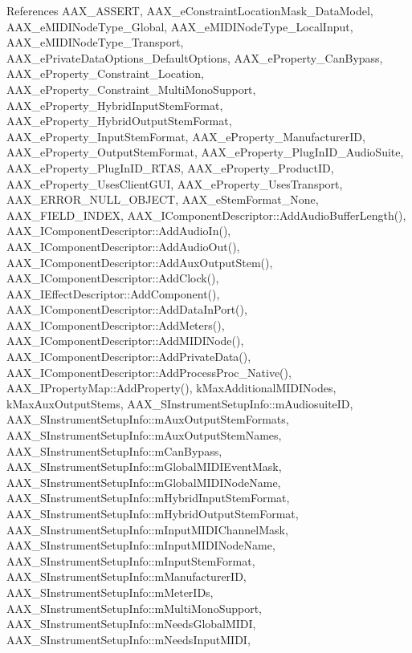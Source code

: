 References A\+A\+X\+\_\+\+A\+S\+S\+E\+R\+T, A\+A\+X\+\_\+e\+Constraint\+Location\+Mask\+\_\+\+Data\+Model, A\+A\+X\+\_\+e\+M\+I\+D\+I\+Node\+Type\+\_\+\+Global, A\+A\+X\+\_\+e\+M\+I\+D\+I\+Node\+Type\+\_\+\+Local\+Input, A\+A\+X\+\_\+e\+M\+I\+D\+I\+Node\+Type\+\_\+\+Transport, A\+A\+X\+\_\+e\+Private\+Data\+Options\+\_\+\+Default\+Options, A\+A\+X\+\_\+e\+Property\+\_\+\+Can\+Bypass, A\+A\+X\+\_\+e\+Property\+\_\+\+Constraint\+\_\+\+Location, A\+A\+X\+\_\+e\+Property\+\_\+\+Constraint\+\_\+\+Multi\+Mono\+Support, A\+A\+X\+\_\+e\+Property\+\_\+\+Hybrid\+Input\+Stem\+Format, A\+A\+X\+\_\+e\+Property\+\_\+\+Hybrid\+Output\+Stem\+Format, A\+A\+X\+\_\+e\+Property\+\_\+\+Input\+Stem\+Format, A\+A\+X\+\_\+e\+Property\+\_\+\+Manufacturer\+I\+D, A\+A\+X\+\_\+e\+Property\+\_\+\+Output\+Stem\+Format, A\+A\+X\+\_\+e\+Property\+\_\+\+Plug\+In\+I\+D\+\_\+\+Audio\+Suite, A\+A\+X\+\_\+e\+Property\+\_\+\+Plug\+In\+I\+D\+\_\+\+R\+T\+A\+S, A\+A\+X\+\_\+e\+Property\+\_\+\+Product\+I\+D, A\+A\+X\+\_\+e\+Property\+\_\+\+Uses\+Client\+G\+U\+I, A\+A\+X\+\_\+e\+Property\+\_\+\+Uses\+Transport, A\+A\+X\+\_\+\+E\+R\+R\+O\+R\+\_\+\+N\+U\+L\+L\+\_\+\+O\+B\+J\+E\+C\+T, A\+A\+X\+\_\+e\+Stem\+Format\+\_\+\+None, A\+A\+X\+\_\+\+F\+I\+E\+L\+D\+\_\+\+I\+N\+D\+E\+X, A\+A\+X\+\_\+\+I\+Component\+Descriptor\+::\+Add\+Audio\+Buffer\+Length(), A\+A\+X\+\_\+\+I\+Component\+Descriptor\+::\+Add\+Audio\+In(), A\+A\+X\+\_\+\+I\+Component\+Descriptor\+::\+Add\+Audio\+Out(), A\+A\+X\+\_\+\+I\+Component\+Descriptor\+::\+Add\+Aux\+Output\+Stem(), A\+A\+X\+\_\+\+I\+Component\+Descriptor\+::\+Add\+Clock(), A\+A\+X\+\_\+\+I\+Effect\+Descriptor\+::\+Add\+Component(), A\+A\+X\+\_\+\+I\+Component\+Descriptor\+::\+Add\+Data\+In\+Port(), A\+A\+X\+\_\+\+I\+Component\+Descriptor\+::\+Add\+Meters(), A\+A\+X\+\_\+\+I\+Component\+Descriptor\+::\+Add\+M\+I\+D\+I\+Node(), A\+A\+X\+\_\+\+I\+Component\+Descriptor\+::\+Add\+Private\+Data(), A\+A\+X\+\_\+\+I\+Component\+Descriptor\+::\+Add\+Process\+Proc\+\_\+\+Native(), A\+A\+X\+\_\+\+I\+Property\+Map\+::\+Add\+Property(), k\+Max\+Additional\+M\+I\+D\+I\+Nodes, k\+Max\+Aux\+Output\+Stems, A\+A\+X\+\_\+\+S\+Instrument\+Setup\+Info\+::m\+Audiosuite\+I\+D, A\+A\+X\+\_\+\+S\+Instrument\+Setup\+Info\+::m\+Aux\+Output\+Stem\+Formats, A\+A\+X\+\_\+\+S\+Instrument\+Setup\+Info\+::m\+Aux\+Output\+Stem\+Names, A\+A\+X\+\_\+\+S\+Instrument\+Setup\+Info\+::m\+Can\+Bypass, A\+A\+X\+\_\+\+S\+Instrument\+Setup\+Info\+::m\+Global\+M\+I\+D\+I\+Event\+Mask, A\+A\+X\+\_\+\+S\+Instrument\+Setup\+Info\+::m\+Global\+M\+I\+D\+I\+Node\+Name, A\+A\+X\+\_\+\+S\+Instrument\+Setup\+Info\+::m\+Hybrid\+Input\+Stem\+Format, A\+A\+X\+\_\+\+S\+Instrument\+Setup\+Info\+::m\+Hybrid\+Output\+Stem\+Format, A\+A\+X\+\_\+\+S\+Instrument\+Setup\+Info\+::m\+Input\+M\+I\+D\+I\+Channel\+Mask, A\+A\+X\+\_\+\+S\+Instrument\+Setup\+Info\+::m\+Input\+M\+I\+D\+I\+Node\+Name, A\+A\+X\+\_\+\+S\+Instrument\+Setup\+Info\+::m\+Input\+Stem\+Format, A\+A\+X\+\_\+\+S\+Instrument\+Setup\+Info\+::m\+Manufacturer\+I\+D, A\+A\+X\+\_\+\+S\+Instrument\+Setup\+Info\+::m\+Meter\+I\+Ds, A\+A\+X\+\_\+\+S\+Instrument\+Setup\+Info\+::m\+Multi\+Mono\+Support, A\+A\+X\+\_\+\+S\+Instrument\+Setup\+Info\+::m\+Needs\+Global\+M\+I\+D\+I, A\+A\+X\+\_\+\+S\+Instrument\+Setup\+Info\+::m\+Needs\+Input\+M\+I\+D\+I, 